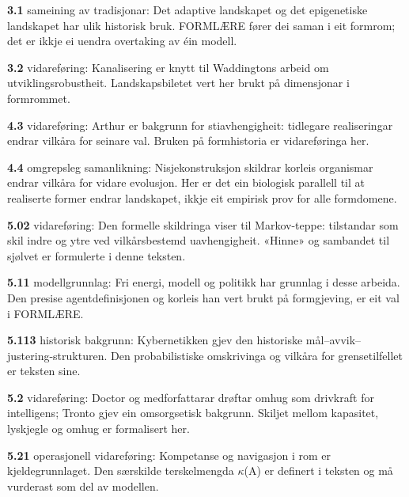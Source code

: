 \begin{widebody}
\noindent\hypertarget{kjeldenotat-3.1}{}\textbf{3.1} sameining av tradisjonar: Det adaptive landskapet og det epigenetiske landskapet har ulik historisk bruk. FORMLÆRE fører dei saman i eit formrom; det er ikkje ei uendra overtaking av éin modell.\par\medskip
\noindent\hypertarget{kjeldenotat-3.2}{}\textbf{3.2} vidareføring: Kanalisering er knytt til Waddingtons arbeid om utviklingsrobustheit. Landskapsbiletet vert her brukt på dimensjonar i formrommet.\par\medskip
\noindent\hypertarget{kjeldenotat-4.3}{}\textbf{4.3} vidareføring: Arthur er bakgrunn for stiavhengigheit: tidlegare realiseringar endrar vilkåra for seinare val. Bruken på formhistoria er vidareføringa her.\par\medskip
\noindent\hypertarget{kjeldenotat-4.4}{}\textbf{4.4} omgrepsleg samanlikning: Nisjekonstruksjon skildrar korleis organismar endrar vilkåra for vidare evolusjon. Her er det ein biologisk parallell til at realiserte former endrar landskapet, ikkje eit empirisk prov for alle formdomene.\par\medskip
\noindent\hypertarget{kjeldenotat-5.02}{}\textbf{5.02} vidareføring: Den formelle skildringa viser til Markov-teppe: tilstandar som skil indre og ytre ved vilkårsbestemd uavhengigheit. «Hinne» og sambandet til sjølvet er formulerte i denne teksten.\par\medskip
\noindent\hypertarget{kjeldenotat-5.11}{}\textbf{5.11} modellgrunnlag: Fri energi, modell og politikk har grunnlag i desse arbeida. Den presise agentdefinisjonen og korleis han vert brukt på formgjeving, er eit val i FORMLÆRE.\par\medskip
\noindent\hypertarget{kjeldenotat-5.113}{}\textbf{5.113} historisk bakgrunn: Kybernetikken gjev den historiske mål–avvik–justering-strukturen. Den probabilistiske omskrivinga og vilkåra for grensetilfellet er teksten sine.\par\medskip
\noindent\hypertarget{kjeldenotat-5.2}{}\textbf{5.2} vidareføring: Doctor og medforfattarar drøftar omhug som drivkraft for intelligens; Tronto gjev ein omsorgsetisk bakgrunn. Skiljet mellom kapasitet, lyskjegle og omhug er formalisert her.\par\medskip
\noindent\hypertarget{kjeldenotat-5.21}{}\textbf{5.21} operasjonell vidareføring: Kompetanse og navigasjon i rom er kjeldegrunnlaget. Den særskilde terskelmengda \ensuremath{κ}(A) er definert i teksten og må vurderast som del av modellen.\par\medskip

\end{widebody}
